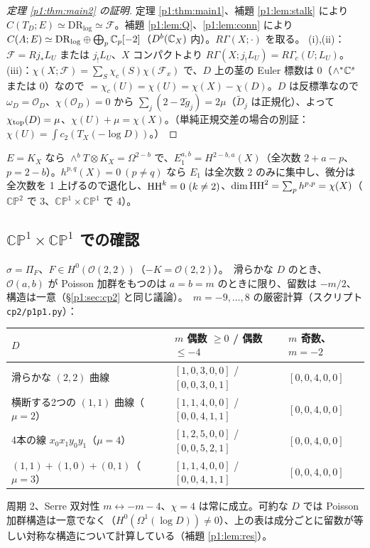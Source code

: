 \begin{proof}[定理 \ref{p1:thm:main2} の証明]
定理 \ref{p1:thm:main1}、補題 \ref{p1:lem:stalk} により $C(T_D;E)\simeq\mathrm{DR}_{\log}\simeq\mathcal F$。補題 \ref{p1:lem:Q}、\ref{p1:lem:conn} により $C(A;E)\simeq\mathrm{DR}_{\log}\oplus\bigoplus_p\mathbb C_p[-2]$（$D^b(\mathbb C_X)$ 内）。$R\Gamma(X;\cdot)$ を取る。
(i),(ii)：$\mathcal F=Rj_*L_U$ または $j_!L_U$、$X$ コンパクトより $R\Gamma(X;j_!L_U)=R\Gamma_c(U;L_U)$。
(iii)：$\chi(X;\mathcal F)=\sum_S\chi_c(S)\chi(\mathcal F_x)$ で、$D$ 上の茎の Euler 標数は 0（$\wedge^*\mathbb C^s$ または 0）なので $=\chi_c(U)=\chi(U)=\chi(X)-\chi(D)$。$D$ は反標準なので $\omega_D=\mathcal O_D$、$\chi(\mathcal O_D)=0$ から $\sum_j(2-2\tilde g_j)=2\mu$（$\tilde D_j$ は正規化）、よって $\chi_{\rm top}(D)=\mu$、$\chi(U)+\mu=\chi(X)$。（単純正規交差の場合の別証：$\chi(U)=\int c_2(T_X(-\log D))$。）
\end{proof}
\begin{prop}[$r_i=1$：$E=K_X$]\tP\label{p1:prop:K}
$E=K_X$ なら $\wedge^bT\otimes K_X=\Omega^{2-b}$ で、$E_1^{a,b}=H^{2-b,a}(X)$（全次数 $2+a-p$、$p=2-b$）。$h^{p,q}(X)=0\ (p\ne q)$ なら $E_1$ は全次数 2 のみに集中し、微分は全次数を 1 上げるので退化し、$\mathrm{HH}^k=0\ (k\ne2)$、$\dim\mathrm{HH}^2=\sum_ph^{p,p}=\chi(X)$（$\mathbb{CP}^2$ で 3、$\mathbb{CP}^1\times\mathbb{CP}^1$ で 4）。
\end{prop}

\subsection{$\mathbb{CP}^1\times\mathbb{CP}^1$ での確認}
$\sigma=\Pi_F$、$F\in H^0(\mathcal O(2,2))$（$-K=\mathcal O(2,2)$）。\tP\ 滑らかな $D$ のとき、$\mathcal O(a,b)$ が Poisson 加群をもつのは $a=b=m$ のときに限り、留数は $-m/2$、構造は一意（\S\ref{p1:sec:cp2} と同じ議論）。\tV\ $m=-9,\dots,8$ の厳密計算（スクリプト \texttt{cp2/p1p1.py}）：
\begin{center}\small
\begin{tabular}{lll}\toprule
$D$ & $m$ 偶数 $\ge0$ / 偶数 $\le-4$ & $m$ 奇数、$m=-2$\\\midrule
滑らかな $(2,2)$ 曲線 & $[1,0,3,0,0]$ / $[0,0,3,0,1]$ & $[0,0,4,0,0]$\\
横断する2つの $(1,1)$ 曲線（$\mu=2$）& $[1,1,4,0,0]$ / $[0,0,4,1,1]$ & $[0,0,4,0,0]$\\
4本の線 $x_0x_1y_0y_1$（$\mu=4$）& $[1,2,5,0,0]$ / $[0,0,5,2,1]$ & $[0,0,4,0,0]$\\
$(1,1)+(1,0)+(0,1)$（$\mu=3$）& $[1,1,4,0,0]$ / $[0,0,4,1,1]$ & $[0,0,4,0,0]$\\\bottomrule
\end{tabular}
\end{center}
周期 2、Serre 双対性 $m\leftrightarrow-m-4$、$\chi=4$ は常に成立。可約な $D$ では Poisson 加群構造は一意でなく（$H^0(\Omega^1(\log D))\ne0$）、上の表は成分ごとに留数が等しい対称な構造について計算している（補題 \ref{p1:lem:res}）。

